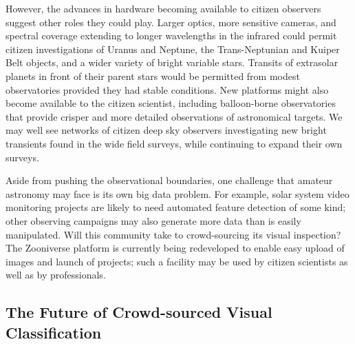\documentclass{ar2e}
\begin{document}
However, the advances in hardware becoming available to citizen observers
suggest other roles they could play. Larger optics, more sensitive cameras, and
spectral coverage extending to longer wavelengths in the infrared could permit
citizen investigations of Uranus and Neptune, the Trans-Neptunian and Kuiper
Belt objects, and a wider variety of bright variable stars.  Transits of
extrasolar planets in front of their parent stars would be permitted from modest
observatories provided they had stable conditions.  New platforms might also
become available to the citizen scientist, including balloon-borne observatories
that provide crisper and more detailed observations of astronomical targets. We
may well see networks of citizen deep sky observers investigating new bright
transients found in the wide field surveys,  while continuing to expand their
own surveys.

Aside from pushing the observational boundaries, one challenge that amateur
astronomy may face is its own big data problem.   For example, solar system
video monitoring projects are likely to need automated feature detection of some
kind; other observing campaigns may also generate more data than is easily
manipulated. Will this community take to crowd-sourcing its visual inspection?
The Zooniverse platform is currently being redeveloped to enable easy upload of images
and launch of projects; such a facility may be used by citizen scientists as well as by 
professionals. 



% 

\subsection{The Future of Crowd-sourced Visual Classification}
\end{document}
